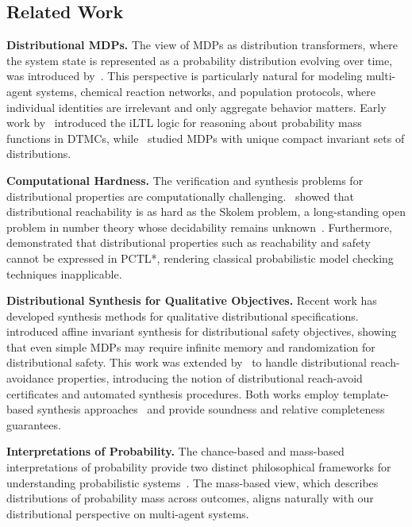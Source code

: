 \documentclass{article}
\begin{document}
\subsection{Related Work}

\textbf{Distributional MDPs.} The view of MDPs as distribution transformers, where the system state is represented as a probability distribution evolving over time, was introduced by~\citep{akshay2018distributionbased}. This perspective is particularly natural for modeling multi-agent systems, chemical reaction networks, and population protocols, where individual identities are irrelevant and only aggregate behavior matters. Early work by~\citep{kwon2011verifying} introduced the iLTL logic for reasoning about probability mass functions in DTMCs, while~\citep{chadha2011model} studied MDPs with unique compact invariant sets of distributions.

\textbf{Computational Hardness.} The verification and synthesis problems for distributional properties are computationally challenging.~\citep{akshay2015reachability} showed that distributional reachability is as hard as the Skolem problem, a long-standing open problem in number theory whose decidability remains unknown~\citep{ouaknine2012decision}. Furthermore,~\citep{beauquier2006logic} demonstrated that distributional properties such as reachability and safety cannot be expressed in PCTL*, rendering classical probabilistic model checking techniques inapplicable.

\textbf{Distributional Synthesis for Qualitative Objectives.} Recent work has developed synthesis methods for qualitative distributional specifications.~\citep{akshay2023mdpsdistributiontransformersaffine} introduced affine invariant synthesis for distributional safety objectives, showing that even simple MDPs may require infinite memory and randomization for distributional safety. This work was extended by~\citep{akshay2024certifiedpolicyverificationsynthesis} to handle distributional reach-avoidance properties, introducing the notion of distributional reach-avoid certificates and automated synthesis procedures. Both works employ template-based synthesis approaches~\citep{DBLP:journals/corr/abs-1902-04373,Coln2003LinearIG} and provide soundness and relative completeness guarantees.

\textbf{Interpretations of Probability.} The chance-based and mass-based interpretations of probability provide two distinct philosophical frameworks for understanding probabilistic systems~\citep{tsai2025chancemassinterpretationsprobabilities}. The mass-based view, which describes distributions of probability mass across outcomes, aligns naturally with our distributional perspective on multi-agent systems.
\end{document}
